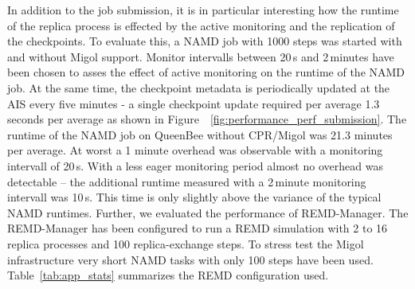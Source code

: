 \documentclass[times, 10pt, twocolumn]{article}
\begin{document}
In addition to the job submission, it is in particular interesting how
the runtime of the replica process is effected by the active
monitoring and the replication of the checkpoints.  To evaluate this,
a NAMD job with 1000 steps was started with and without Migol support.
Monitor intervalls between 20\,s and 2\,minutes have been chosen to
asses the effect of active monitoring on the runtime of the NAMD
job. At the same time, the checkpoint metadata is periodically updated
at the AIS every five minutes - a single checkpoint update required
per average 1.3\,seconds per average as shown in
Figure~~\ref{fig:performance_perf_submission}. The runtime of the NAMD
job on QueenBee without CPR/Migol was 21.3 minutes per average. At
worst a 1 minute overhead was observable with a monitoring intervall
of 20\,s. With a less eager monitoring period almost no overhead was
detectable -- the additional runtime measured with a 2\,minute
monitoring intervall was 10\,s. This time is only slightly above the
variance of the typical NAMD runtimes.
Further, we evaluated the performance of REMD-Manager. The REMD-Manager has been configured 
to run a REMD simulation with 2 to 16 replica processes and 100 replica-exchange
steps. To stress test the Migol infrastructure very short NAMD tasks 
with only 100 steps have been used. Table~\ref{tab:app_stats} summarizes the REMD configuration used.
\end{document}
